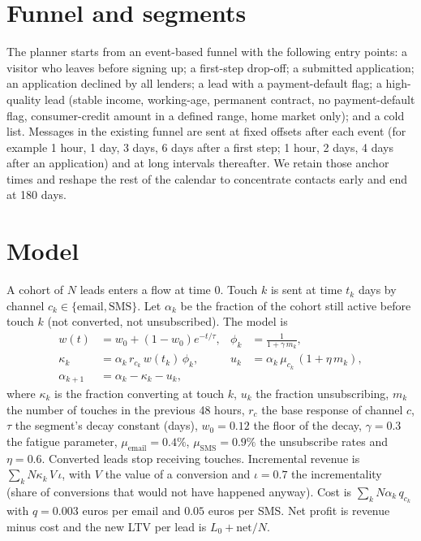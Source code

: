 \documentclass[10pt,a4paper]{article}
\begin{document}
\section{Funnel and segments}
The planner starts from an event-based funnel with the following entry points: a visitor who leaves before signing up; a first-step drop-off; a submitted application; an application declined by all lenders; a lead with a payment-default flag; a high-quality lead (stable income, working-age, permanent contract, no payment-default flag, consumer-credit amount in a defined range, home market only); and a cold list. Messages in the existing funnel are sent at fixed offsets after each event (for example 1 hour, 1 day, 3 days, 6 days after a first step; 1 hour, 2 days, 4 days after an application) and at long intervals thereafter. We retain those anchor times and reshape the rest of the calendar to concentrate contacts early and end at 180 days.

\section{Model}
A cohort of $N$ leads enters a flow at time $0$. Touch $k$ is sent at time $t_k$ days by channel $c_k\in\{\text{email},\text{SMS}\}$. Let $\alpha_k$ be the fraction of the cohort still active before touch $k$ (not converted, not unsubscribed). The model is
\begin{align}
 w(t)&=w_0+(1-w_0)e^{-t/\tau}, & \phi_k&=\frac{1}{1+\gamma\,m_k},\\
 \kappa_k&=\alpha_k\,r_{c_k}\,w(t_k)\,\phi_k, & u_k&=\alpha_k\,\mu_{c_k}\,(1+\eta\,m_k),\\
 \alpha_{k+1}&=\alpha_k-\kappa_k-u_k,
\end{align}
where $\kappa_k$ is the fraction converting at touch $k$, $u_k$ the fraction unsubscribing, $m_k$ the number of touches in the previous 48 hours, $r_c$ the base response of channel $c$, $\tau$ the segment's decay constant (days), $w_0=0.12$ the floor of the decay, $\gamma=0.3$ the fatigue parameter, $\mu_{\text{email}}=0.4\%$, $\mu_{\text{SMS}}=0.9\%$ the unsubscribe rates and $\eta=0.6$. Converted leads stop receiving touches. Incremental revenue is $\sum_k N\kappa_k\,V\,\iota$, with $V$ the value of a conversion and $\iota=0.7$ the incrementality (share of conversions that would not have happened anyway). Cost is $\sum_k N\alpha_k\,q_{c_k}$ with $q=0.003$ euros per email and $0.05$ euros per SMS. Net profit is revenue minus cost and the new LTV per lead is $L_0+\text{net}/N$.
\end{document}
